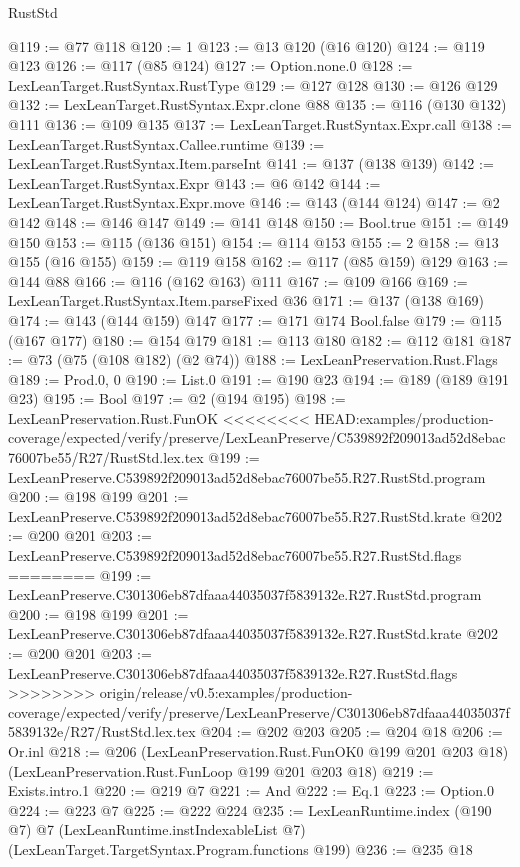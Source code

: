 \begin{lexlean}{RustStd}
\begin{coremodule}
{\begin{coremodule}
{{{{{@119 := @77 @118
@120 := 1
@123 := @13 @120 (@16 @120)
@124 := @119 @123
@126 := @117 (@85 @124)
@127 := Option.none.{0}
@128 := LexLeanTarget.RustSyntax.RustType
@129 := @127 @128
@130 := @126 @129
@132 := LexLeanTarget.RustSyntax.Expr.clone @88
@135 := @116 (@130 @132) @111
@136 := @109 @135
@137 := LexLeanTarget.RustSyntax.Expr.call
@138 := LexLeanTarget.RustSyntax.Callee.runtime
@139 := LexLeanTarget.RustSyntax.Item.parseInt
@141 := @137 (@138 @139)
@142 := LexLeanTarget.RustSyntax.Expr
@143 := @6 @142
@144 := LexLeanTarget.RustSyntax.Expr.move
@146 := @143 (@144 @124)
@147 := @2 @142
@148 := @146 @147
@149 := @141 @148
@150 := Bool.true
@151 := @149 @150
@153 := @115 (@136 @151)
@154 := @114 @153
@155 := 2
@158 := @13 @155 (@16 @155)
@159 := @119 @158
@162 := @117 (@85 @159) @129
@163 := @144 @88
@166 := @116 (@162 @163) @111
@167 := @109 @166
@169 := LexLeanTarget.RustSyntax.Item.parseFixed @36
@171 := @137 (@138 @169)
@174 := @143 (@144 @159) @147
@177 := @171 @174 Bool.false
@179 := @115 (@167 @177)
@180 := @154 @179
@181 := @113 @180
@182 := @112 @181
@187 := @73 (@75 (@108 @182) (@2 @74))
@188 := LexLeanPreservation.Rust.Flags
@189 := Prod.{0, 0}
@190 := List.{0}
@191 := @190 @23
@194 := @189 (@189 @191 @23)
@195 := Bool
@197 := @2 (@194 @195)
@198 := LexLeanPreservation.Rust.FunOK
<<<<<<<< HEAD:examples/production-coverage/expected/verify/preserve/LexLeanPreserve/C539892f209013ad52d8ebac76007be55/R27/RustStd.lex.tex
@199 := LexLeanPreserve.C539892f209013ad52d8ebac76007be55.R27.RustStd.program
@200 := @198 @199
@201 := LexLeanPreserve.C539892f209013ad52d8ebac76007be55.R27.RustStd.krate
@202 := @200 @201
@203 := LexLeanPreserve.C539892f209013ad52d8ebac76007be55.R27.RustStd.flags
========
@199 := LexLeanPreserve.C301306eb87dfaaa44035037f5839132e.R27.RustStd.program
@200 := @198 @199
@201 := LexLeanPreserve.C301306eb87dfaaa44035037f5839132e.R27.RustStd.krate
@202 := @200 @201
@203 := LexLeanPreserve.C301306eb87dfaaa44035037f5839132e.R27.RustStd.flags
>>>>>>>> origin/release/v0.5:examples/production-coverage/expected/verify/preserve/LexLeanPreserve/C301306eb87dfaaa44035037f5839132e/R27/RustStd.lex.tex
@204 := @202 @203
@205 := @204 @18
@206 := Or.inl
@218 := @206
    (LexLeanPreservation.Rust.FunOK0 @199 @201 @203 @18)
    (LexLeanPreservation.Rust.FunLoop @199 @201 @203 @18)
@219 := Exists.intro.{1}
@220 := @219 @7
@221 := And
@222 := Eq.{1}
@223 := Option.{0}
@224 := @223 @7
@225 := @222 @224
@235 := LexLeanRuntime.index
    (@190 @7)
    @7
    (LexLeanRuntime.instIndexableList @7)
    (LexLeanTarget.TargetSyntax.Program.functions @199)
@236 := @235 @18
}}}}}
\end{coremodule}}
\end{coremodule}
\end{lexlean}
